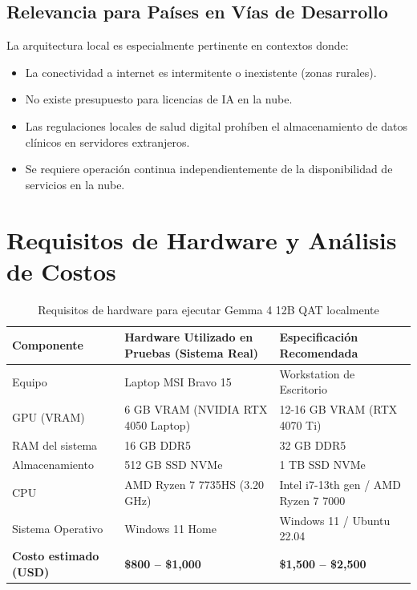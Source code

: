 \documentclass[12pt,a4paper]{article}
\begin{document}
\subsection{Relevancia para Países en Vías de Desarrollo}

La arquitectura local es especialmente pertinente en contextos donde:
\begin{itemize}
  \item La conectividad a internet es intermitente o inexistente (zonas rurales).
  \item No existe presupuesto para licencias de IA en la nube.
  \item Las regulaciones locales de salud digital prohíben el almacenamiento de datos clínicos
    en servidores extranjeros.
  \item Se requiere operación continua independientemente de la disponibilidad de servicios
    en la nube.
\end{itemize}

\newpage

\section{Requisitos de Hardware y Análisis de Costos}

\begin{table}[H]
  \centering
  \caption{Requisitos de hardware para ejecutar Gemma 4 12B QAT localmente}
  \begin{tabularx}{\textwidth}{lXX}
    \toprule
    \textbf{Componente} & \textbf{Hardware Utilizado en Pruebas (Sistema Real)} & \textbf{Especificación Recomendada} \\
    \midrule
    Equipo & Laptop MSI Bravo 15 & Workstation de Escritorio \\
    \midrule
    GPU (VRAM) & 6 GB VRAM (NVIDIA RTX 4050 Laptop) & 12-16 GB VRAM (RTX 4070 Ti) \\
    \midrule
    RAM del sistema & 16 GB DDR5 & 32 GB DDR5 \\
    \midrule
    Almacenamiento & 512 GB SSD NVMe & 1 TB SSD NVMe \\
    \midrule
    CPU & AMD Ryzen 7 7735HS (3.20 GHz) & Intel i7-13th gen / AMD Ryzen 7 7000 \\
    \midrule
    Sistema Operativo & Windows 11 Home & Windows 11 / Ubuntu 22.04 \\
    \midrule
    \textbf{Costo estimado (USD)} & \textbf{\$800 -- \$1,000} & \textbf{\$1,500 -- \$2,500} \\
    \bottomrule
  \end{tabularx}
\end{table}
\end{document}
